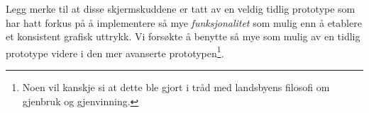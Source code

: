 Legg merke til at disse skjermskuddene er tatt av en veldig tidlig prototype som har hatt forkus på å implementere så mye \emph{funksjonalitet} som mulig enn å etablere et konsistent grafisk uttrykk. Vi forsøkte å benytte så mye som mulig av en tidlig prototype videre i den mer avanserte prototypen\footnote{Noen vil kanskje si at dette ble gjort i tråd med landsbyens filosofi om gjenbruk og gjenvinning.}.